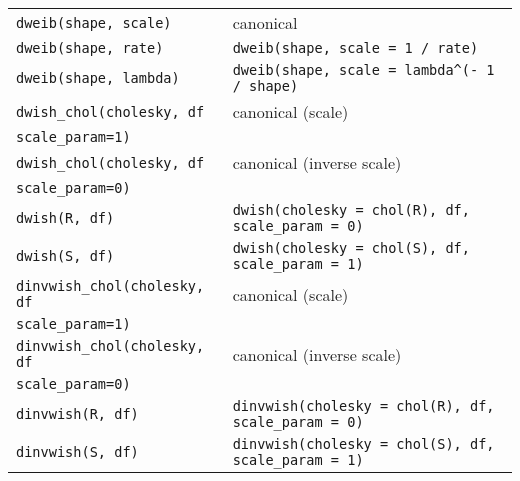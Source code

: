 \begin{center}
\begin{longtable}{ll}
     \texttt{dweib(shape, scale)} & canonical \\
     \texttt{dweib(shape, rate)} & \verb|dweib(shape, scale = 1 / rate)| \\
     \texttt{dweib(shape, lambda)} & \verb|dweib(shape, scale = lambda^(- 1 / shape)| \\
     \texttt{dwish_chol(cholesky, df} & canonical (scale) \\
       \hspace{5mm}\texttt{scale\_param=1)}          & \\
     \texttt{dwish_chol(cholesky, df} & canonical (inverse scale) \\
       \hspace{5mm}\texttt{scale\_param=0)}          & \\
     \texttt{dwish(R, df)} & \texttt{dwish(cholesky = chol(R), df, scale\_param = 0)}\\ 
     \texttt{dwish(S, df)} & \texttt{dwish(cholesky = chol(S), df, scale\_param = 1)}\\ 
     \texttt{dinvwish_chol(cholesky, df} & canonical (scale) \\
       \hspace{5mm}\texttt{scale\_param=1)}          & \\
     \texttt{dinvwish_chol(cholesky, df} & canonical (inverse scale) \\
       \hspace{5mm}\texttt{scale\_param=0)}          & \\
     \texttt{dinvwish(R, df)} & \texttt{dinvwish(cholesky = chol(R), df, scale\_param = 0)}\\
     \texttt{dinvwish(S, df)} & \texttt{dinvwish(cholesky = chol(S), df, scale\_param = 1)}\\
     \end{longtable}
  \end{center}
